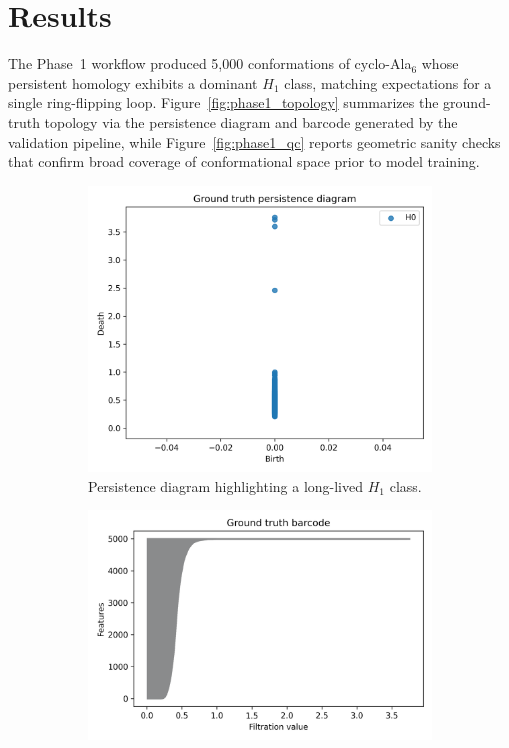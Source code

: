 \documentclass[11pt]{article}
\theoremstyle{definition}
\begin{document}
\section{Results}
The Phase~1 workflow produced 5{,}000 conformations of cyclo-Ala$_6$ whose persistent homology exhibits a dominant $H_1$ class, matching expectations for a single ring-flipping loop. Figure~\ref{fig:phase1_topology} summarizes the ground-truth topology via the persistence diagram and barcode generated by the validation pipeline, while Figure~\ref{fig:phase1_qc} reports geometric sanity checks that confirm broad coverage of conformational space prior to model training.

\begin{figure}[t]
    \centering
    \begin{subfigure}{0.48\linewidth}
        \centering
        \includegraphics[width=\linewidth]{../results/phase1/ground_truth_pd.png}
        \caption{Persistence diagram highlighting a long-lived $H_1$ class.}
        \label{fig:phase1_pd}
    \end{subfigure}
    \hfill
    \begin{subfigure}{0.48\linewidth}
        \centering
        \includegraphics[width=\linewidth]{../results/phase1/ground_truth_barcode.png}

\end{subfigure}
\end{figure}
\end{document}
